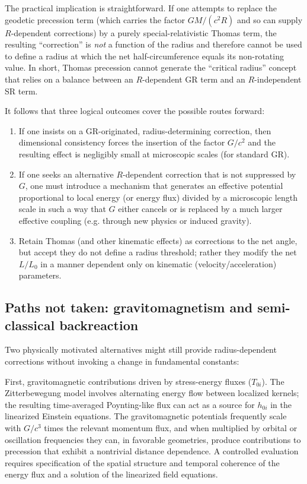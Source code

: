\documentclass[%
 reprint,
 amsmath,amssymb,
 aps,
]{revtex4-1}
\numberwithin{equation}{section}
\begin{document}
The practical implication is straightforward. If one attempts to replace the geodetic precession term (which carries the factor $GM/(c^{2}R)$ and so can supply $R$-dependent corrections) by a purely special-relativistic Thomas term, the resulting ``correction'' is \emph{not} a function of the radius and therefore cannot be used to define a radius at which the net half-circumference equals its non-rotating value. In short, Thomas precession cannot generate the ``critical radius'' concept that relies on a balance between an $R$-dependent GR term and an $R$-independent SR term.

It follows that three logical outcomes cover the possible routes forward:
\begin{enumerate}
\item If one insists on a GR-originated, radius-determining correction, then dimensional consistency forces the insertion of the factor $G/c^{2}$ and the resulting effect is negligibly small at microscopic scales (for standard GR).
\item If one seeks an alternative $R$-dependent correction that is not suppressed by $G$, one must introduce a mechanism that generates an effective potential proportional to local energy (or energy flux) divided by a microscopic length scale in such a way that $G$ either cancels or is replaced by a much larger effective coupling (e.g. through new physics or induced gravity).
\item Retain Thomas (and other kinematic effects) as corrections to the net angle, but accept they do not define a radius threshold; rather they modify the net $L/L_0$ in a manner dependent only on kinematic (velocity/acceleration) parameters.
\end{enumerate}

\subsection{Paths not taken: gravitomagnetism and semi-classical backreaction}

Two physically motivated alternatives might still provide radius-dependent corrections without invoking a change in fundamental constants:

First, gravitomagnetic contributions driven by stress-energy fluxes ($T_{0i}$). The Zitterbewegung model involves alternating energy flow between localized kernels; the resulting time-averaged Poynting-like flux can act as a source for $h_{0i}$ in the linearized Einstein equations. The gravitomagnetic potentials frequently scale with $G/c^{3}$ times the relevant momentum flux, and when multiplied by orbital or oscillation frequencies they can, in favorable geometries, produce contributions to precession that exhibit a nontrivial distance dependence. A controlled evaluation requires specification of the spatial structure and temporal coherence of the energy flux and a solution of the linearized field equations.
\end{document}
